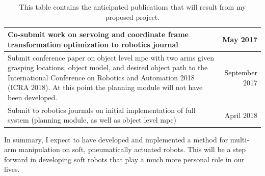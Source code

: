\documentclass[12pt, letterpaper]{article}
\begin{document}
\noindent
\begin{table}[H]
\centering
\begin{tabularx}{0.99\textwidth}{|X|X|}%
 \hline
 Co-submit work on servoing and coordinate frame transformation optimization to robotics journal & \multicolumn{1}{|r|}{May 2017} \\%
 \hline
 Submit conference paper on object level mpc with two arms given grasping locations, object model, and desired object path to the International Conference on Robotics and Automation 2018 (ICRA 2018). At this point the planning module will not have been developed. & \multicolumn{1}{|r|}{September 2017} \\%
 \hline
 Submit to robotics journals on initial implementation of full system (planning module, as well as object level mpc)  & \multicolumn{1}{|r|}{April 2018} \\%
 \hline
\end{tabularx}
\caption{This table contains the anticipated publications that will result from my proposed project.}
\label{tab:publications}
\end{table}

In summary, I expect to have developed and implemented a method for multi-arm manipulation on soft, pneumatically actuated robots. This will be a step forward in developing soft robots that play a much more personal role in our lives.

\pagebreak



\end{document}
